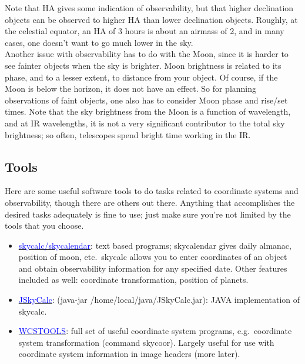 \documentclass[12pt]{article}
\begin{document}
\noindent Note that HA gives some indication of observability, but that
higher declination objects can be observed to higher HA than lower
declination objects. Roughly, at the celestial equator, an HA of 3 hours
is about an airmass of 2, and in many cases, one doesn't want to go much
lower in the sky.\\

\noindent Another issue with observability has to do with the Moon,
since it is harder to see fainter objects when the sky is brighter.
Moon brightness is related to its phase, and to a lesser extent, to
distance from your object. Of course, if the Moon is below the horizon,
it does not have an effect. So for planning observations of faint objects,
one also has to consider Moon phase and rise/set times. Note that the
sky brightness from the Moon is a function of wavelength, and at IR
wavelengths, it is not a very significant contributor to the total sky
brightness; so often, telescopes spend bright time working in the IR.

\subsection*{Tools}
Here are some useful software tools to do tasks related to coordinate systems
and observability, though there are others out there. Anything that
accomplishes the desired tasks adequately is fine to use; just make sure
you're not limited by the tools that you choose.
\begin{itemize}
    \item \href{http://physics.dartmouth.edu/}
        {\textcolor{blue}{skycalc/skycalendar}}:
        text based programs; skycalendar gives daily almanac, position of moon,
        etc.\ skycalc allows you to enter coordinates of an object and obtain
        observability information for any specified date. Other features included
        as well: coordinate transformation, position of planets.
    \item \href{http://physics.dartmouth.edu/}
        {\textcolor{blue}{JSkyCalc}}:
        (java-jar /home/local/java/JSkyCalc.jar): JAVA implementation
        of skycalc.
    \item \href{http://tdc-www.harvard.edu/wcstools/}
        {\textcolor{blue}{WCSTOOLS}}: full set of useful coordinate
        system programs, e.g.\ coordinate system transformation (command skycoor).
        Largely useful for use with coordinate system information in image
        headers (more later).
\end{itemize}
\end{document}
